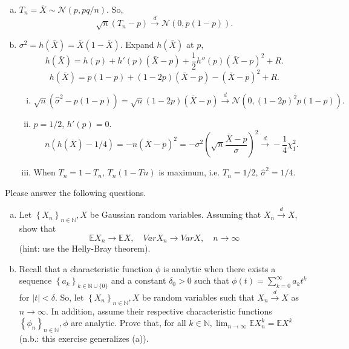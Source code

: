 \begin{solution}
    \begin{enumerate}[(a)]
        \item $T_n=\bar{X}\sim\mathcal{N}(p, pq/n)$. So, 
        \[
            \sqrt{n}(T_n-p) \stackrel{d}{\rightarrow} \mathcal{N}(0, p(1-p)).
        \]
        \item $\sigma^2=h(\bar{X})=\bar{X}(1-\bar{X})$. Expand $h(\bar{X})$ at $p$, 
        \[
            h(\bar{X})=h(p)+h'(p)(\bar{X}-p)+\frac{1}{2}h''(p)(\bar{X}-p)^2+R. 
        \]
        \[
            h(\bar{X})=p(1-p)+(1-2p)(\bar{X}-p)-(\bar{X}-p)^2+R. 
        \]
        \begin{enumerate}[(i)]
            \item \[
                \sqrt{n}\left(\widehat{\sigma}^{2}-p(1-p)\right)=\sqrt{n}(1-2p)(\bar{X}-p)\stackrel{d}{\to} \mathcal{N}(0,(1-2 p)^{2} p(1-p)).
            \]
            \item $p=1/2$, $h'(p)=0$. 
            \[
                n(h(\bar{X})-1/4) =-n(\bar{X}-p)^2=-\sigma^2\left(\sqrt{n}\frac{\bar{X}-p}{\sigma}\right)^2\stackrel{d}{\to} -\frac{1}{4} \chi_{1}^{2}.
            \]
            \item When $T_n=1-T_n$, $T_n(1-Tn)$ is maximum, i.e. $T_n=1/2$, $\widehat{\sigma}^2=1/4$. 
        \end{enumerate}
    \end{enumerate}
\end{solution}

\begin{ex}
    Please answer the following questions. 
    \begin{enumerate}[(a)]
        \item Let \(\left\{X_{n}\right\}_{n \in \mathbb{N}}, X\) be Gaussian random variables. Assuming that \(X_{n} \stackrel{d}{\rightarrow} X\), show that
        \[
            \mathbb{E} X_{n} \rightarrow \mathbb{E} X, \quad Var X_{n} \rightarrow Var X, \quad n \rightarrow \infty
        \]
        (hint: use the Helly-Bray theorem). 
        \item Recall that a characteristic function \(\phi\) is analytic when there exists a sequence \(\left\{a_{k}\right\}_{k \in \mathbb{N} \cup\{0\}}\) and a constant \(\delta_{0}>0\) such that \(\phi(t)=\sum_{k=0}^{\infty} a_{k} t^{k}\) for \(|t|<\delta\). So, let \(\left\{X_{n}\right\}_{n \in \mathbb{N}}, X\) be random variables such that \(X_{n} \stackrel{d}{\rightarrow} X\) as \(n \rightarrow \infty\). In addition, assume their respective characteristic functions \(\left\{\phi_{n}\right\}_{n \in \mathbb{N}}, \phi\) are analytic. Prove that, for all \(k \in \mathbb{N}, \lim _{n \rightarrow \infty} \mathbb{E} X_{n}^{k}=\mathbb{E} X^{k}\) (n.b.: this exercise generalizes (a)).
    \end{enumerate}
\end{ex}

